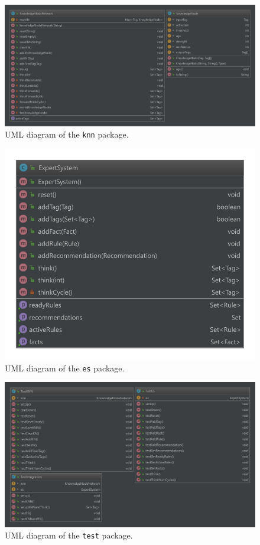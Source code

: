 \documentclass[titlepage,11pt]{article}
\newcommand{\code}[1]{\texttt{#1}}
\begin{document}
\begin{figure}[!htb]
	\centering
	\includegraphics[width=\columnwidth]{figures/uml_knn.pdf}
	\caption{UML diagram of the \code{knn} package.}
	\label{uml_knn}
\end{figure}

\begin{figure}[!htb]
	\centering
	\includegraphics[width=0.5\columnwidth]{figures/uml_es.pdf}
	\caption{UML diagram of the \code{es} package.}
	\label{uml_es}
\end{figure}

\begin{figure}[!htb]
	\centering
	\includegraphics[width=\columnwidth]{figures/uml_test.pdf}
	\caption{UML diagram of the \code{test} package.}
	\label{uml_test}
\end{figure}

\clearpage

{}

\end{document}
